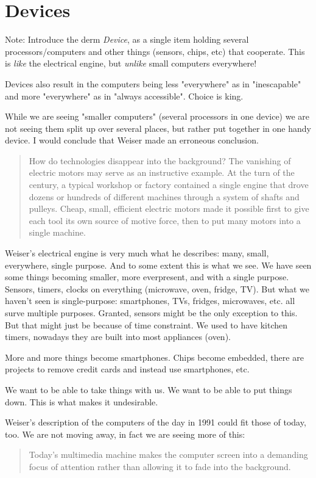 \section{Devices}

Note: Introduce the derm \emph{Device}, as a single item holding several processors/computers and other things (sensors, chips,
etc) that cooperate. This is \emph{like} the electrical engine, but \emph{unlike} small computers everywhere!

Devices also result in the computers being less "everywhere" as in "inescapable" and more "everywhere" as in "always accessible".
Choice is king.

While we are seeing "smaller computers" (several processors in one device) we are not seeing them split up over several places,
but rather put together in one handy device. I would conclude that Weiser made an erroneous conclusion.

\begin{quote}
    How do technologies disappear into the background? The vanishing of electric motors may serve as an instructive example.
    At the turn of the century, a typical workshop or factory contained a single engine that drove dozens or hundreds of
    different machines through a system of shafts and pulleys. Cheap, small, efficient electric motors made it possible first
    to give each tool its own source of motive force, then to put many motors into a single machine.\cite{weiser91}
\end{quote}

Weiser's electrical engine is very much what he describes: many, small, everywhere, single purpose. And to some extent
this is what we see. We have seen some things becoming smaller, more everpresent, and with a single purpose. Sensors, timers,
clocks on everything (microwave, oven, fridge, TV). But what we haven't seen is single-purpose: smartphones, TVs, fridges,
microwaves, etc. all surve multiple purposes. Granted, sensors might be the only exception to this. But that might just 
be because of time constraint. We used to have kitchen timers, nowadays they are built into most appliances (oven).

More and more things become smartphones. Chips become embedded, there are projects to remove credit cards and instead use
smartphones, etc.

We want to be able to take things with us. We want to be able to put things down. This is what makes it undesirable.

Weiser's description of the computers of the day in 1991 could fit those of today, too. We are not moving away, in fact we are
seeing more of this:

\begin{quote}
    Today's multimedia machine makes the computer screen into a demanding focus of attention rather than allowing it to fade
    into the background.\cite{weiser91}
\end{quote}